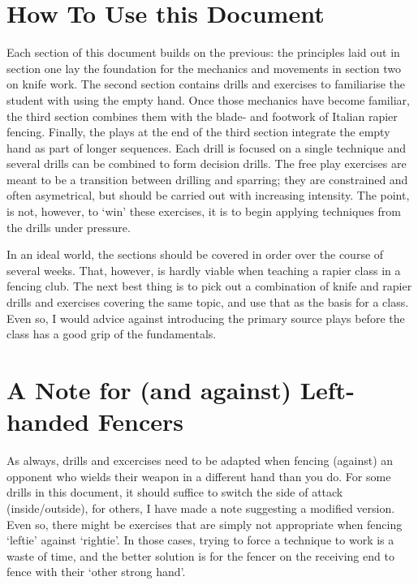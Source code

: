 \documentclass[article, 12pt, a4paper]{memoir}
\begin{document}
\section*{How To Use this Document}
Each section of this document builds on the previous: the principles laid out in section one lay the foundation for the mechanics and movements in section two on knife work.
The second section contains drills and exercises to familiarise the student with using the empty hand.
Once those mechanics have become familiar, the third section combines them with the blade- and footwork of Italian rapier fencing.
Finally, the plays at the end of the third section integrate the empty hand as part of longer sequences.
Each drill is focused on a single technique and several drills can be combined to form decision drills.
The free play exercises are meant to be a transition between drilling and sparring; they are constrained and often asymetrical, but should be carried out with increasing intensity.
The point, is not, however, to `win' these exercises, it is to begin applying techniques from the drills under pressure.

In an ideal world, the sections should be covered in order over the course of several weeks.
That, however, is hardly viable when teaching a rapier class in a fencing club.
The next best thing is to pick out a combination of knife and rapier drills and exercises covering the same topic, and use that as the basis for a class.
Even so, I would advice against introducing the primary source plays before the class has a good grip of the fundamentals.

\section*{A Note for (and against) Left-handed Fencers}
As always, drills and excercises need to be adapted when fencing (against) an opponent who wields their weapon in a different hand than you do.
For some drills in this document, it should suffice to switch the side of attack (inside/outside), for others, I have made a note suggesting a modified version.
Even so, there might be exercises that are simply not appropriate when fencing `leftie' against `rightie'.
In those cases, trying to force a technique to work is a waste of time, and the better solution is for the fencer on the receiving end to fence with their `other strong hand'.
\end{document}
